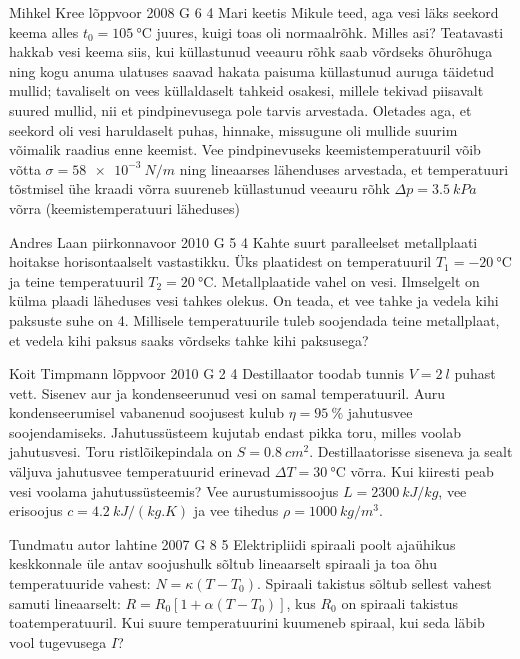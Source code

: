 \documentclass[11pt, twoside]{article}
\begin{document}
{%
{Mihkel Kree} %
{lõppvoor} %
{2008} %
{G 6} %
{4} %
{
\ifStatement
Mari keetis Mikule teed, aga vesi läks seekord keema alles $t_0= \SI{105}{\celsius}$ juures, kuigi toas oli normaalrõhk. Milles asi? Teatavasti hakkab vesi keema siis, kui küllastunud veeauru rõhk saab võrdseks õhurõhuga ning kogu anuma ulatuses saavad hakata paisuma küllastunud auruga täidetud mullid; tavaliselt on vees küllaldaselt tahkeid osakesi, millele tekivad piisavalt suured mullid, nii et pindpinevusega pole tarvis arvestada. Oletades aga, et seekord oli vesi haruldaselt puhas, hinnake, missugune oli mullide suurim võimalik raadius enne keemist. Vee pindpinevuseks keemistemperatuuril võib võtta $\sigma = \SI{58e-3}{N/m}$ ning lineaarses lähenduses arvestada, et temperatuuri tõstmisel ühe kraadi võrra suureneb küllastunud veeauru rõhk $\Delta p = \SI{3,5}{kPa}$ võrra (keemistemperatuuri läheduses)
\fi
}

{Andres Laan} %
{piirkonnavoor} %
{2010} %
{G 5} %
{4} %
{
\ifStatement
Kahte suurt paralleelset metallplaati hoitakse horisontaalselt vastastikku. Üks plaatidest on temperatuuril $T_1 = \SI{-20}{\celsius}$ ja teine temperatuuril $T_2 = \SI{20}{\celsius}$. Metallplaatide vahel on vesi. Ilmselgelt on külma plaadi läheduses vesi tahkes olekus. On teada, et vee tahke ja vedela kihi paksuste suhe on \num{4}. Millisele temperatuurile tuleb soojendada teine metallplaat, et vedela kihi paksus saaks võrdseks tahke kihi paksusega?
\fi
}

{Koit Timpmann} %
{lõppvoor} %
{2010} %
{G 2} %
{4} %
{
\ifStatement
Destillaator toodab tunnis $V=\SI{2}{l}$ puhast vett. Sisenev aur ja kondenseerunud vesi on samal temperatuuril. Auru kondenseerumisel vabanenud soojusest kulub $\eta=\SI{95}{\%}$ jahutusvee soojendamiseks. Jahutussüsteem kujutab endast pikka toru, milles voolab jahutusvesi. Toru ristlõikepindala on $S=\SI{0,8}{cm^2}$. Destillaatorisse siseneva ja sealt väljuva jahutusvee temperatuurid erinevad $\Delta T=\SI{30}{\celsius}$ võrra. Kui kiiresti peab vesi voolama jahutussüsteemis? Vee aurustumissoojus $L=\SI{2300}{kJ/kg}$, vee erisoojus $c = \SI{4,2}{kJ/(kg.K)}$ ja vee tihedus $\rho=\SI{1000}{kg/m^3}$.
\fi
}

{Tundmatu autor} %
{lahtine} %
{2007} %
{G 8} %
{5} %
{
\ifStatement
Elektripliidi spiraali poolt ajaühikus keskkonnale üle antav soojushulk sõltub lineaarselt spiraali ja toa õhu temperatuuride vahest: $N = \kappa (T - T_0)$. Spiraali takistus sõltub sellest vahest samuti lineaarselt: $R = R_0 [1+\alpha (T -T_0)]$, kus $R_0$ on spiraali takistus toatemperatuuril. Kui suure temperatuurini kuumeneb spiraal, kui seda läbib vool tugevusega $I$?
\fi
}

}
\end{document}
